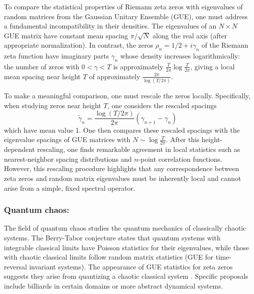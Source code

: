 \documentclass{article}
\begin{document}
    To compare the statistical properties of Riemann zeta zeros with eigenvalues of random matrices from the Gaussian Unitary Ensemble (GUE), one must address a fundamental incompatibility in their densities. The eigenvalues of an $N \times N$ GUE matrix have constant mean spacing $\pi/\sqrt{N}$ along the real axis (after appropriate normalization). In contrast, the zeros $\rho_n = 1/2 + i\gamma_n$ of the Riemann zeta function have imaginary parts $\gamma_n$ whose density increases logarithmically: the number of zeros with $0 < \gamma < T$ is approximately $\frac{T}{2\pi}\log\frac{T}{2\pi}$, giving a local mean spacing near height $T$ of approximately $\frac{2\pi}{\log(T/2\pi)}$. 

To make a meaningful comparison, one must rescale the zeros locally. Specifically, when studying zeros near height $T$, one considers the rescaled spacings
$$\tilde{\gamma}_n = \frac{\log(T/2\pi)}{2\pi}(\gamma_{n+1} - \gamma_n)$$
which have mean value 1. One then compares these rescaled spacings with the eigenvalue spacings of GUE matrices with $N \sim \log\frac{T}{2\pi}$. After this height-dependent rescaling, one finds remarkable agreement in local statistics such as nearest-neighbor spacing distributions and $n$-point correlation functions. However, this rescaling procedure highlights that any correspondence between zeta zeros and random matrix eigenvalues must be inherently local and cannot arise from a simple, fixed spectral operator.

 \subsubsection{Quantum chaos:} The field of quantum chaos studies the quantum mechanics of classically chaotic systems. The Berry-Tabor conjecture states that quantum systems with integrable classical limits have Poisson statistics for their eigenvalues, while those with chaotic classical limits follow random matrix statistics (GUE for time-reversal invariant systems). The appearance of GUE statistics for zeta zeros suggests they arise from quantizing a chaotic classical system \cite{BerryKeatingChaos}. Specific proposals include billiards in certain domains or more abstract dynamical systems.
\end{document}
